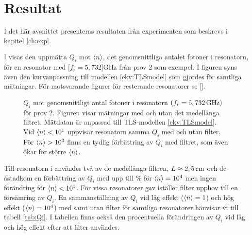 \documentclass[main.tex]{subfiles}
\begin{document}
\chapter{Resultat}
\label{sec:results}
I det här avsnittet presenteras resultaten från experimenten som beskrevs i kapitel \ref{ch:exp}. 

 
I  visas den uppmätta $Q_i$ mot $\expval{n}$, det genomsnittliga antalet fotoner i resonatorn, för en resonator med \unit[$f_r=5,732$]{GHz} från prov 2 som exempel. I figuren syns även den kurvanpassning till modellen \eqref{ekv:TLSmodel} som gjordes för samtliga mätningar. För motsvarande figurer för resterande resonatorer se \ref{}.%

\begin{figure}[H]
  \centering
  \setlength{}
  \setlength\figureheight{9em}
  
  \caption{$Q_i$ mot genomsnittligt antal fotoner i resonatorn $(f_r=\unit[5,732]{GHz})$ för prov 2. Figuren visar mätningar med och utan det medellånga filtret. Mätdatan är anpassad till TLS-modellen \eqref{ekv:TLSmodel}. Vid $\expval{n}<10^1$ uppvisar resonatorn samma $Q_i$ med och utan filter. För $\expval{n}>10^3$ finns en tydlig förbättring av $Q_i$ med filtret, som även ökar för större $\expval{n}$.}
  \label{fig:Qi_n}
\end{figure}


Till resonatorn i  användes två av de medellånga filtren, $L\approx \unit[2,5]{cm}$ och de åstadkom en förbättring av $Q_i$ med upp till \unit[46]{\%} för $\expval{n}=10^4$ men ingen förändring för $\expval{n}<10^1$. För vissa resonatorer gav istället filter upphov till en försämring av $Q_i$. En sammanställning av $Q_i$ vid låg effekt ($\expval{n}=1$) och hög effekt ($\expval{n}=10^4$) med samt utan filter för samtliga resonatorer hänvisar vi till tabell \ref{tab:Qi}. I tabellen finns också den procentuella förändringen av $Q_i$ vid låg och hög effekt efter att filter användes.
\end{document}
